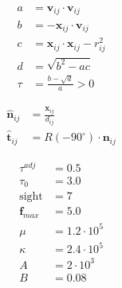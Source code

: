 \begin{align}
a &= \mathbf{v}_{ij} \cdot \mathbf{v}_{ij} \\
b &= -\mathbf{x}_{ij} \cdot \mathbf{v}_{ij} \\
c &= \mathbf{x}_{ij} \cdot \mathbf{x}_{ij} - r_{ij}^{2} \\
d &= \sqrt{b^{2} - a c} \\
\tau &= \frac{b - \sqrt{d}}{a} > 0
\end{align}

\begin{align}
\hat{\mathbf{n}}_{ij} &= \frac{\mathbf{x}_{ij}}{d_{ij}} \\
\hat{\mathbf{t}}_{ij} &= R(-90^{\circ}) \cdot \mathbf{n}_{ij}
\end{align}


\begin{align}
\tau^{adj} &= 0.5 \\
\tau_{0} &= 3.0 \\
\text{sight} & = 7 \\
\mathbf{f}_{max} &= 5.0 \\
\mu &= 1.2 \cdot 10^{5} \\
\kappa &= 2.4 \cdot 10^{5} \\
A &= 2\cdot 10^{3} \\
B &= 0.08
\end{align}
